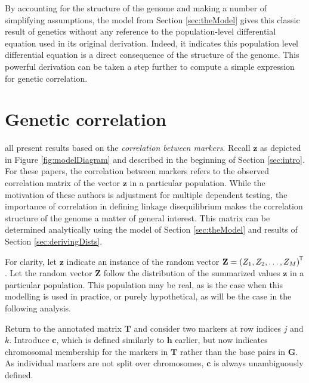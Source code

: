 \documentclass[sts]{imsart}
\newcommand{\ve}[1]{\mathbf{#1}}           %
\newcommand{\m}[1]{\mathbf{#1}}               %
\newcommand{\tr}[1]{{#1}^{\mkern-1.5mu\mathsf{T}}}              %
\begin{document}
By accounting for the structure of the genome and making a number of simplifying assumptions, the model from Section \ref{sec:theModel} gives this classic result of genetics without any reference to the population-level differential equation used in its original derivation. Indeed, it indicates this population level differential equation is a direct consequence of the structure of the genome. This powerful derivation can be taken a step further to compute a simple expression for genetic correlation.

\section{Genetic correlation} \label{sec:correlation}

\cite{cheverud2001, LiJi2005, Galwey2009} all present results based on the \emph{correlation between markers}. Recall $\ve{z}$ as depicted in Figure \ref{fig:modelDiagram} and described in the beginning of Section \ref{sec:intro}. For these papers, the correlation between markers refers to the observed correlation matrix of the vector $\ve{z}$ in a particular population. While the motivation of these authors is adjustment for multiple dependent testing, the importance of correlation in defining linkage disequilibrium makes the correlation structure of the genome a matter of general interest. This matrix can be determined analytically using the model of Section \ref{sec:theModel} and results of Section \ref{sec:derivingDists}.

For clarity, let $\ve{z}$ indicate an instance of the random vector $\ve{Z} = \tr{(Z_1, Z_2, \dots, Z_M)}$. Let the random vector $\ve{Z}$ follow the distribution of the summarized values $\ve{z}$ in a particular population. This population may be real, as is the case when this modelling is used in practice, or purely hypothetical, as will be the case in the following analysis.

Return to the annotated matrix $\m{T}$ and consider two markers at row indices $j$ and $k$. Introduce $\ve{c}$, which is defined similarly to $\ve{h}$ earlier, but now indicates chromosomal membership for the markers in $\m{T}$ rather than the base pairs in $\m{G}$. As individual markers are not split over chromosomes, $\ve{c}$ is always unambiguously defined.
\end{document}
